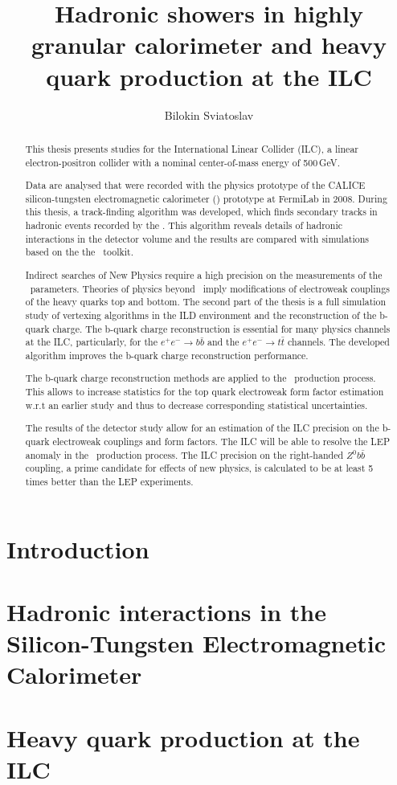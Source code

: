 \documentclass[a4paper, 12pt]{article}
\title{Hadronic showers in highly granular calorimeter and heavy quark production at the ILC}
\author{Bilokin Sviatoslav}
\begin{document}
\maketitle
\begin{abstract}

This thesis presents studies for the International Linear Collider (ILC), a linear electron-positron collider with a nominal center-of-mass energy of 500\,GeV.

Data are analysed that were recorded with the physics prototype of the CALICE silicon-tungsten electromagnetic calorimeter (\ecal) prototype at FermiLab in 2008. During this thesis, a track-finding algorithm was developed, which finds secondary tracks in hadronic events recorded by the \ecalp. This algorithm reveals details of hadronic interactions in the detector volume and the results are compared with simulations based on the the \geant\ toolkit.

Indirect searches of New Physics require a high precision on the measurements of the \sm\ parameters. Theories of physics beyond \sm\ imply modifications of electroweak couplings of the heavy quarks top and bottom. The second part of the thesis is a full simulation study of vertexing algorithms in the ILD environment and the reconstruction of the b-quark charge. The b-quark charge reconstruction is essential for many physics channels at the ILC, particularly, for the $e^+e^-\to b\bar{b}$ and the $e^+e^-\to t\bar{t}$ channels.
The developed algorithm improves the b-quark charge reconstruction performance.

The b-quark charge reconstruction methods are applied to the \ttbar\ production process. This allows to increase statistics for the top quark electroweak form factor estimation w.r.t an earlier study and thus to decrease corresponding statistical uncertainties.

The results of the detector study allow for an estimation of the ILC precision on the b-quark electroweak couplings and form factors. The ILC will be able to resolve the LEP anomaly in the \bbbar\ production process. The ILC precision on the right-handed $Z^0b\bar{b}$ coupling, a prime candidate for effects of new physics, is calculated to be at least 5 times better than the LEP experiments. 
\end{abstract}
\tableofcontents
\linenumbers
\newpage\part{Introduction}\label{PARTI}

\newpage

\newpage

\newpage\part{Hadronic interactions in the Silicon-Tungsten Electromagnetic Calorimeter}\label{PARTII}

\newpage\part{Heavy quark production at the ILC}\label{PARTIII}



\end{document}
